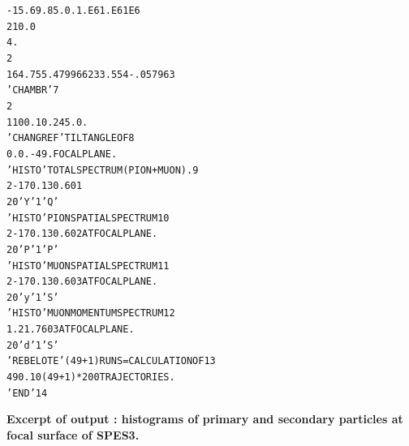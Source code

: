 \begin{alltt}
  -15.  69.       85.  0.    1.E6  1.E6 1E6
  2 10.0
  4.                                                                            
  2                                                                             
  164.755 .479966 233.554 -.057963                                              
  'CHAMBR'                                                               7      
  2                                                                             
  1   100. 10. 245.  0.                                                         
  'CHANGREF'                          TILT  ANGLE  OF                    8      
  0.   0.   -49.                      FOCAL  PLANE.                             
  'HISTO'                             TOTAL  SPECTRUM (PION + MUON).     9      
  2  -170.  130.  60  1                                                         
  20  'Y'  1  'Q'                                                               
  'HISTO'                             PION  SPATIAL  SPECTRUM           10      
  2  -170.  130.  60  2               AT  FOCAL  PLANE.                         
  20  'P'  1  'P'                                                               
  'HISTO'                             MUON  SPATIAL  SPECTRUM           11      
  2  -170.  130.  60  3               AT  FOCAL  PLANE.                         
  20  'y'  1  'S'                                                               
  'HISTO'                             MUON  MOMENTUM  SPECTRUM          12      
  1    .2   1.7   60  3               AT  FOCAL  PLANE.                         
  20  'd'  1  'S'                                                               
  'REBELOTE'                          (49+1)  RUNS =  CALCULATION  OF   13      
  49  0.1  0                          (49+1)*200  TRAJECTORIES.                 
  'END'                                                                 14      
\end{alltt}



\clearpage
\tiny
\twocolumn
\noindent \textbf{\normalsize Excerpt of \zgoubi output : histograms of primary and secondary particles at focal surface of SPES3.}


